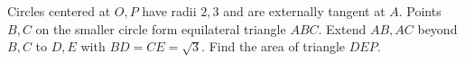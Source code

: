 Circles centered at $O,P$ have radii $2,3$ and are externally tangent at $A$. Points $B,C$ on the smaller circle form equilateral triangle $ABC$. Extend $AB,AC$ beyond $B,C$ to $D,E$ with $BD=CE=\sqrt3$. Find the area of triangle $DEP$.
